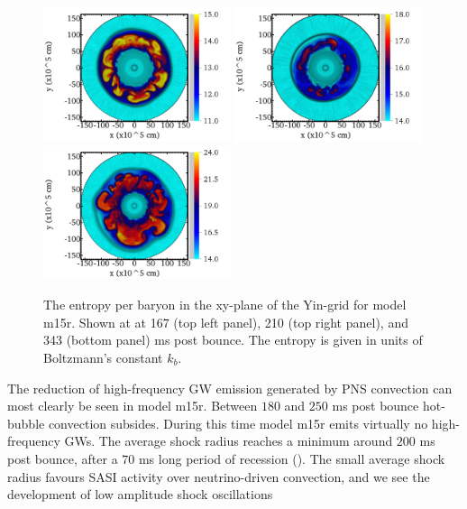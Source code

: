 \begin{figure}[ht]         
\centering                            
\includegraphics[width=0.49\textwidth]{./images/paper2/1.png}
\includegraphics[width=0.49\textwidth]{./images/paper2/2.png} \\
\includegraphics[width=0.49\textwidth]{./images/paper2/3.png}
\caption{The entropy per baryon in the xy-plane of the Yin-grid for model m15r. Shown at
at 167 (top left panel), 210 (top right panel), and 343 (bottom panel) ms post bounce. 
The entropy is given in units of Boltzmann's constant $k_b$. \label{figp2:sto}}
\end{figure}
The reduction of high-frequency GW emission generated by PNS convection can most clearly be seen in model
m15r. Between $180$ and $250$ ms post bounce hot-bubble convection subsides. During this time
model m15r emits virtually no high-frequency GWs. 
The average shock radius reaches a minimum  around $200$ ms post bounce, after
a $70$ ms long period of recession (). The small average shock radius favours SASI activity over
neutrino-driven convection, and we see the development of low amplitude shock oscillations
